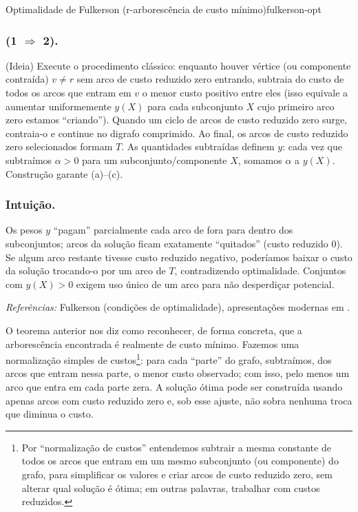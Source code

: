 \begin{teobox}{Optimalidade de Fulkerson (r-arborescência de custo mínimo)}{fulkerson-opt}
	\subsubsection{(1 $\Rightarrow$ 2).} (Ideia) Execute o procedimento clássico: enquanto houver vértice (ou componente contraída) $v\neq r$ sem arco de custo reduzido zero entrando, subtraia do custo de todos os arcos que entram em $v$ o menor custo positivo entre eles (isso equivale a aumentar uniformemente $y(X)$ para cada subconjunto $X$ cujo primeiro arco zero estamos “criando”). Quando um ciclo de arcos de custo reduzido zero surge, contraia-o e continue no digrafo comprimido. Ao final, os arcos de custo reduzido zero selecionados formam $T$. As quantidades subtraídas definem $y$: cada vez que subtraímos $\alpha>0$ para um subconjunto/componente $X$, somamos $\alpha$ a $y(X)$. Construção garante (a)–(c).

	\subsubsection{Intuição.} Os pesos $y$ “pagam” parcialmente cada arco de fora para dentro dos subconjuntos; arcos da solução ficam exatamente “quitados” (custo reduzido 0). Se algum arco restante tivesse custo reduzido negativo, poderíamos baixar o custo da solução trocando-o por um arco de $T$, contradizendo optimalidade. Conjuntos com $y(X)>0$ exigem uso único de um arco para não desperdiçar potencial.

	\medskip
	\emph{Referências:} Fulkerson (condições de optimalidade), apresentações modernas em \cite{frank2014, schrijver2003comb}.
	\label{thm:fulkerson-optimalidade-arborescencia}
\end{teobox}


O teorema anterior nos diz como reconhecer, de forma concreta, que a arborescência encontrada é realmente de custo mínimo. Fazemos uma normalização simples de custos\footnote{Por “normalização de custos” entendemos subtrair a mesma constante de todos os arcos que entram em um mesmo subconjunto (ou componente) do grafo, para simplificar os valores e criar arcos de custo reduzido zero, sem alterar qual solução é ótima; em outras palavras, trabalhar com custos reduzidos.}: para cada “parte” do grafo, subtraímos, dos arcos que entram nessa parte, o menor custo observado; com isso, pelo menos um arco que entra em cada parte zera. A solução ótima pode ser construída usando apenas arcos com custo reduzido zero e, sob esse ajuste, não sobra nenhuma troca que diminua o custo.


